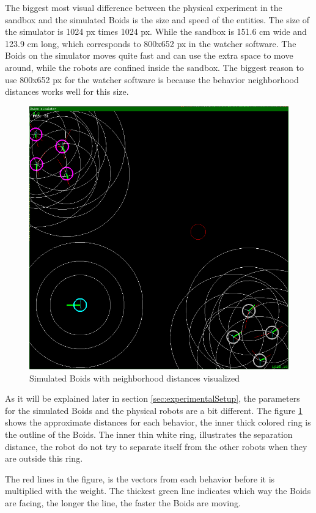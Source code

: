 The biggest most visual difference between the physical experiment in the sandbox and the simulated Boids is the size and speed of the entities. The size of the simulator is 1024 px times 1024 px. While the sandbox is 151.6 cm wide and 123.9 cm long, which corresponds to 800x652 px in the watcher software. The Boids on the simulator moves quite fast and can use the extra space to move around, while the robots are confined inside the sandbox. The biggest reason to use 800x652 px for the watcher software is because the behavior neighborhood distances works well for this size.

\begin{figure}[h]
\begin{center}
\includegraphics[width=0.8\linewidth]{figs/simulator}
\end{center}
\caption[Simulator distances]{Simulated Boids with neighborhood distances visualized}
\label{fig:simulatordistances}
\end{figure}

As it will be explained later in section \ref{sec:experimentalSetup}, the parameters for the simulated Boids and the physical robots are a bit different.
The figure \ref{fig:simulatordistances} shows the approximate distances for each behavior, the inner thick colored ring is the outline of the Boids. The inner thin white ring, illustrates the separation distance, the robot do not try to separate itself from the other robots when they are outside this ring.

The red lines in the figure, is the vectors from each behavior before it is multiplied with the weight. The thickest green line indicates which way the Boids are facing, the longer the line, the faster the Boids are moving.

